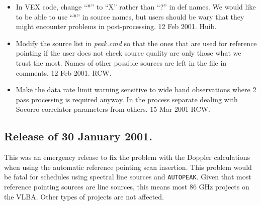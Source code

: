 \documentclass{report}
\begin{document}
\begin{itemize}
\item  In VEX code, change ``*'' to ``X'' rather than ``?'' in def names.
       We would like to be able to use ``*'' in source names, but users
       should be wary that they might encounter problems in post-processing.
       12 Feb 2001. Huib.

\item  Modify the source list in {\sl peak.cmd} so that the ones
       that are used for reference pointing if the user does not check
       source quality are only those what we trust the most.  Names of
       other possible sources are left in the file in comments.
       12 Feb 2001. RCW.

\item  Make the data rate limit warning sensitive to wide band observations
       where 2 pass processing is required anyway.  In the process separate
       dealing with Socorro correlator parameters from others.  15 Mar 2001 RCW.
\end{itemize}

\subsection{\label{SSSEC:30JAN2001}Release of 30 January 2001.}

This was an emergency release to fix the problem with the Doppler
calculations when using the automatic reference pointing scan
insertion.  This problem would be fatal for schedules using spectral
line sources and {\tt AUTOPEAK}.  Given that most reference pointing
sources are line sources, this means most 86 GHz projects on the VLBA.
Other types of projects are not affected.
\end{document}
